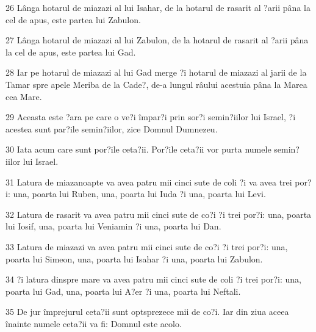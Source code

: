 \par 26 Lânga hotarul de miazazi al lui Isahar, de la hotarul de rasarit al ?arii pâna la cel de apus, este partea lui Zabulon.
\par 27 Lânga hotarul de miazazi al lui Zabulon, de la hotarul de rasarit al ?arii pâna la cel de apus, este partea lui Gad.
\par 28 Iar pe hotarul de miazazi al lui Gad merge ?i hotarul de miazazi al jarii de la Tamar spre apele Meriba de la Cade?, de-a lungul râului acestuia pâna la Marea cea Mare.
\par 29 Aceasta este ?ara pe care o ve?i împar?i prin sor?i semin?iilor lui Israel, ?i acestea sunt par?ile semin?iilor, zice Domnul Dumnezeu.
\par 30 Iata acum care sunt por?ile ceta?ii. Por?ile ceta?ii vor purta numele semin?iilor lui Israel.
\par 31 Latura de miazanoapte va avea patru mii cinci sute de coli ?i va avea trei por?i: una, poarta lui Ruben, una, poarta lui Iuda ?i una, poarta lui Levi.
\par 32 Latura de rasarit va avea patru mii cinci sute de co?i ?i trei por?i: una, poarta lui Iosif, una, poarta lui Veniamin ?i una, poarta lui Dan.
\par 33 Latura de miazazi va avea patru mii cinci sute de co?i ?i trei por?i: una, poarta lui Simeon, una, poarta lui Isahar ?i una, poarta lui Zabulon.
\par 34 ?i latura dinspre mare va avea patru mii cinci sute de coli ?i trei por?i: una, poarta lui Gad, una, poarta lui A?er ?i una, poarta lui Neftali.
\par 35 De jur împrejurul ceta?ii sunt optsprezece mii de co?i. Iar din ziua aceea înainte numele ceta?ii va fi: Domnul este acolo.


